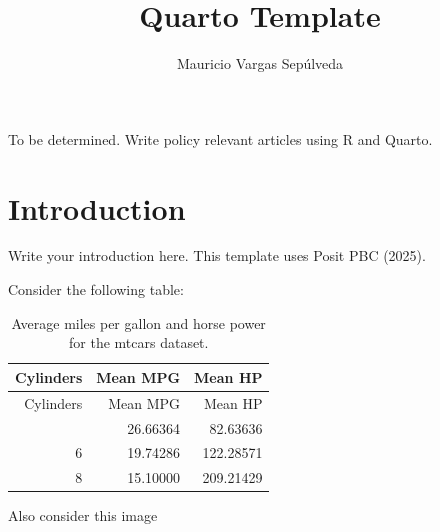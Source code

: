\documentclass{latex/CUP-JNL-DAP}%
\begin{document}
\begin{Frontmatter}

\title[Quarto Template]{Quarto Template}

\author*[1]{Mauricio Vargas
Sepúlveda}


\address*[1]{, , }
\address[2]{\orgdiv{}}




\begin{policy}
To be determined. Write policy relevant articles using R and Quarto.
\end{policy}

\end{Frontmatter}

\section{Introduction}\label{introduction}

Write your introduction here. This template uses Posit PBC (2025).

Consider the following table:

\begin{longtable}[]{@{}rrr@{}}
\caption{Average miles per gallon and horse power for the mtcars
dataset.}\tabularnewline
\toprule\noalign{}
Cylinders & Mean MPG & Mean HP \\
\midrule\noalign{}
\endfirsthead
\toprule\noalign{}
Cylinders & Mean MPG & Mean HP \\
\midrule\noalign{}
\endhead
\bottomrule\noalign{}
\endlastfoot
4 & 26.66364 & 82.63636 \\
6 & 19.74286 & 122.28571 \\
8 & 15.10000 & 209.21429 \\
\end{longtable}

Also consider this image
\end{document}
